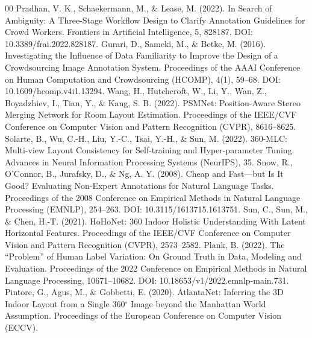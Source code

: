 \documentclass[final,5p,twocolumn]{elsarticle}
\begin{document}
\begin{thebibliography}{00}
 Pradhan, V. K., Schaekermann, M., \& Lease, M. (2022). In Search of Ambiguity: A Three-Stage Workflow Design to Clarify Annotation Guidelines for Crowd Workers. Frontiers in Artificial Intelligence, 5, 828187. DOI: 10.3389/frai.2022.828187.
 Gurari, D., Sameki, M., \& Betke, M. (2016). Investigating the Influence of Data Familiarity to Improve the Design of a Crowdsourcing Image Annotation System. Proceedings of the AAAI Conference on Human Computation and Crowdsourcing (HCOMP), 4(1), 59--68. DOI: 10.1609/hcomp.v4i1.13294.
 Wang, H., Hutchcroft, W., Li, Y., Wan, Z., Boyadzhiev, I., Tian, Y., \& Kang, S. B. (2022). PSMNet: Position-Aware Stereo Merging Network for Room Layout Estimation. Proceedings of the IEEE/CVF Conference on Computer Vision and Pattern Recognition (CVPR), 8616--8625.
 Solarte, B., Wu, C.-H., Liu, Y.-C., Tsai, Y.-H., \& Sun, M. (2022). 360-MLC: Multi-view Layout Consistency for Self-training and Hyper-parameter Tuning. Advances in Neural Information Processing Systems (NeurIPS), 35.
 Snow, R., O'Connor, B., Jurafsky, D., \& Ng, A. Y. (2008). Cheap and Fast---but Is It Good? Evaluating Non-Expert Annotations for Natural Language Tasks. Proceedings of the 2008 Conference on Empirical Methods in Natural Language Processing (EMNLP), 254--263. DOI: 10.3115/1613715.1613751.
 Sun, C., Sun, M., \& Chen, H.-T. (2021). HoHoNet: 360 Indoor Holistic Understanding With Latent Horizontal Features. Proceedings of the IEEE/CVF Conference on Computer Vision and Pattern Recognition (CVPR), 2573--2582.
 Plank, B. (2022). The ``Problem'' of Human Label Variation: On Ground Truth in Data, Modeling and Evaluation. Proceedings of the 2022 Conference on Empirical Methods in Natural Language Processing, 10671--10682. DOI: 10.18653/v1/2022.emnlp-main.731.
 Pintore, G., Agus, M., \& Gobbetti, E. (2020). AtlantaNet: Inferring the 3D Indoor Layout from a Single 360$^\circ$ Image beyond the Manhattan World Assumption. Proceedings of the European Conference on Computer Vision (ECCV).
\end{thebibliography}
\end{document}
